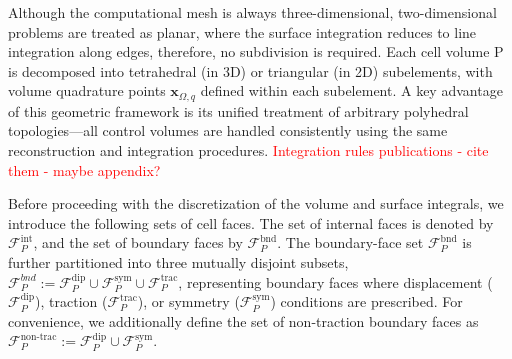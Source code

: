 \documentclass[sn-mathphys,Numbered]{sn-jnl}%
\begin{document}
Although the computational mesh is always three-dimensional, 
two-dimensional problems are treated as planar, where the surface integration reduces to line integration along edges, 
therefore, no subdivision is required.
Each cell volume P is decomposed into tetrahedral
(in 3D) or triangular (in 2D) subelements, with volume quadrature points $\mathbf{x}_{\Omega,q}$ defined within each subelement.
A key advantage of this geometric framework is its unified treatment of arbitrary polyhedral topologies—all control 
volumes are handled consistently using the same reconstruction and integration procedures. 
\textcolor{red}{Integration rules publications - cite them - maybe appendix?}

Before proceeding with the discretization of the volume and surface integrals, we introduce the following sets of cell faces.
The set of internal faces is denoted by $\mathcal{F}_P^{\text{int}}$, and the set of boundary faces by $\mathcal{F}_P^{\text{bnd}}$.
The boundary-face set $\mathcal{F}_P^{\text{bnd}}$ is further partitioned into three mutually disjoint subsets,
$\mathcal{F}_P^{bnd} := \mathcal{F}_P^{\text{dip}} \cup \mathcal{F}_P^{\text{sym}} \cup \mathcal{F}_P^{\text{trac}}$,
representing boundary faces where displacement ($\mathcal{F}_P^{\text{dip}}$), traction ($\mathcal{F}_P^{\text{trac}}$),
 or symmetry ($\mathcal{F}_P^{\text{sym}}$) conditions are prescribed. For convenience, we additionally define the set of non-traction boundary faces as $\mathcal{F}_P^{\text{non-trac}} := \mathcal{F}_P^{\text{dip}} \cup \mathcal{F}_P^{\text{sym}}$.
%
\end{document}
